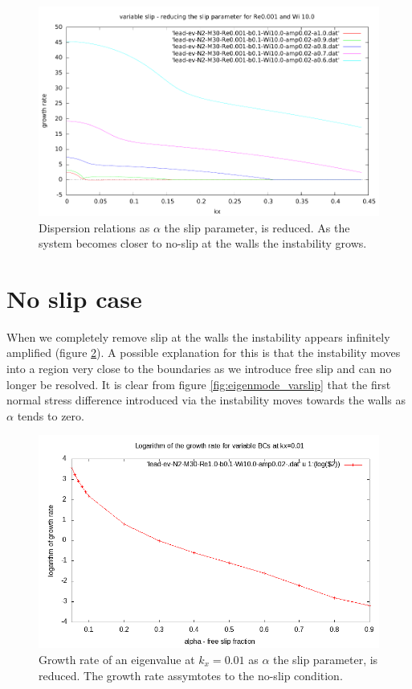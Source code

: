 \documentclass{jfm}
\begin{document}
\begin{figure}
    \centering
    \includegraphics[width=\textwidth]{./figures/dispersions_varslip}
    \caption{Dispersion relations as $\alpha$ the slip parameter, is reduced. As the system becomes closer to no-slip at the walls the instability grows.}
    \label{fig:dispersions_varslip}
\end{figure}

\section{No slip case}

When we completely remove slip at the walls the instability appears infinitely amplified (figure \ref{fig:evaldiverg_varslip}). A possible explanation for this is that the instability moves into a region very close to the boundaries as we introduce free slip and can no longer be resolved. It is clear from figure \ref{fig:eigenmode_varslip} that the first normal stress difference introduced via the instability moves towards the walls as $\alpha$ tends to zero.

\begin{figure}
    \centering
    \includegraphics[width=\textwidth]{./figures/evaldiverg_varslip}
    \caption{Growth rate of an eigenvalue at $k_x=0.01$ as $\alpha$ the slip parameter, is reduced. The growth rate assymtotes to the no-slip condition.}
    \label{fig:evaldiverg_varslip}
\end{figure}
\end{document}
